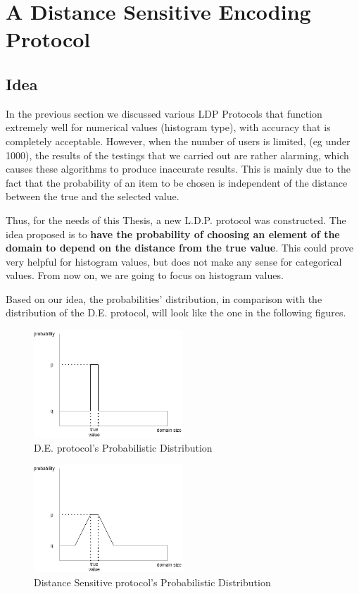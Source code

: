 \section{A Distance Sensitive Encoding Protocol}

\subsection{Idea}

In the previous section we discussed various LDP Protocols that function extremely well for numerical values (histogram type), with accuracy that is completely acceptable. However, when the number of users is limited, (eg under 1000), the results of the testings that we carried out are rather alarming, which causes these algorithms to produce inaccurate results. This is mainly due to the fact that the probability of an item to be chosen is independent of the distance between the true and the selected value.


Thus, for the needs of this Thesis, a new L.D.P. protocol was constructed. The idea proposed is to \textbf{have the probability of choosing an element of the domain to depend on the distance from the true value}. This could prove very helpful for histogram values, but does not make any sense for categorical values. From now on, we are going to focus on histogram values.

Based on our idea, the probabilities' distribution, in comparison with the distribution of the D.E. protocol, will look like the one in the following figures.

\begin{figure}[!htb]\centering
    \includegraphics[width=0.5\textwidth]{images/D.E. Idea.png}
    \caption{D.E. protocol's Probabilistic Distribution}
\end{figure}

\begin{figure}[!htb]\centering
    \includegraphics[width=0.5\textwidth]{images/Our Idea.png}
    \caption{Distance Sensitive protocol's Probabilistic Distribution}
\end{figure}


